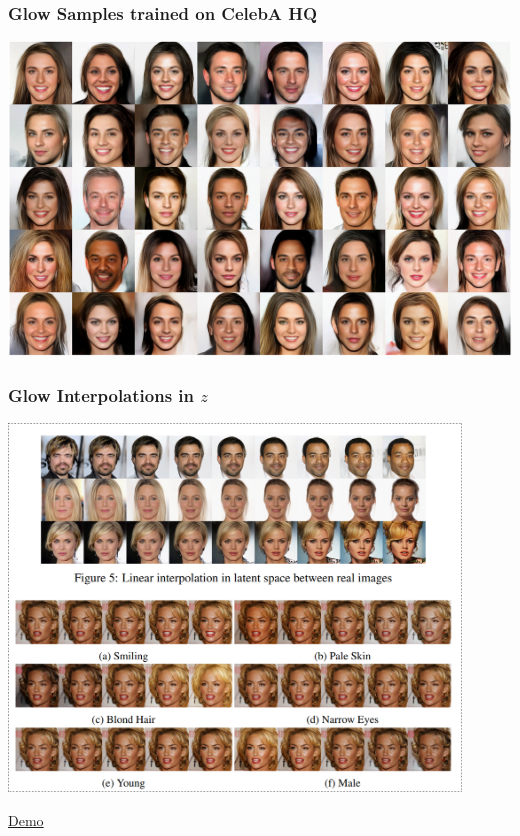 \documentclass{beamer}
\begin{document}
\begin{frame}
  \frametitle{Glow Samples trained on CelebA HQ}

  \includegraphics[width=1.0\textwidth]{glow-more-samples.png}
\end{frame}


\begin{frame}
  \frametitle{Glow Interpolations in $z$}

  \includegraphics[width=0.9\textwidth]{glow-interpolations.png}
\end{frame}

\begin{frame}
  \begin{center}
    \Huge \href{https://openai.com/blog/glow/}{Demo}
  \end{center}
\end{frame}
\end{document}
